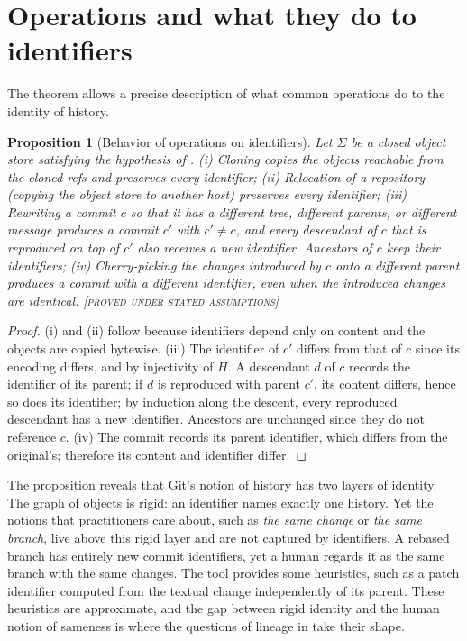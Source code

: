 \documentclass[11pt,twoside,openright]{book}
\theoremstyle{plain}
\newtheorem{proposition}[theorem]{Proposition}
\theoremstyle{definition}
\theoremstyle{remark}
\newcommand{\Proved}{\textup{\textsc{[proved under stated assumptions]}}}
\begin{document}
\section{Operations and what they do to identifiers}

The theorem allows a precise description of what common operations do to the identity of history.

\begin{proposition}[Behavior of operations on identifiers]\label{prop:ops}
Let $\Sigma$ be a closed object store satisfying the hypothesis of .
(i) \emph{Cloning} copies the objects reachable from the cloned refs and preserves every identifier; (ii) \emph{Relocation} of a repository (copying the object store to another host) preserves every identifier; (iii) \emph{Rewriting} a commit $c$ so that it has a different tree, different parents, or different message produces a commit $c'$ with $c'\neq c$, and every descendant of $c$ that is reproduced on top of $c'$ also receives a new identifier. Ancestors of $c$ keep their identifiers; (iv) \emph{Cherry-picking} the changes introduced by $c$ onto a different parent produces a commit with a different identifier, even when the introduced changes are identical.
\Proved{}
\end{proposition}

\begin{proof}
(i) and (ii) follow because identifiers depend only on content and the objects are copied bytewise. (iii) The identifier of $c'$ differs from that of $c$ since its encoding differs, and by injectivity of $H$. A descendant $d$ of $c$ records the identifier of its parent; if $d$ is reproduced with parent $c'$, its content differs, hence so does its identifier; by induction along the descent, every reproduced descendant has a new identifier. Ancestors are unchanged since they do not reference $c$. (iv) The commit records its parent identifier, which differs from the original's; therefore its content and identifier differ.
\end{proof}

The proposition reveals that Git's notion of history has two layers of identity. The graph of objects is rigid: an identifier names exactly one history. Yet the notions that practitioners care about, such as \emph{the same change} or \emph{the same branch}, live above this rigid layer and are not captured by identifiers. A rebased branch has entirely new commit identifiers, yet a human regards it as the same branch with the same changes. The tool provides some heuristics, such as a patch identifier computed from the textual change independently of its parent. These heuristics are approximate, and the gap between rigid identity and the human notion of sameness is where the questions of lineage in  take their shape.
\end{document}

